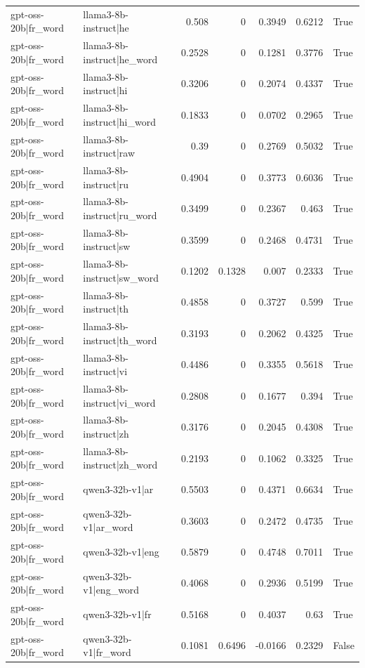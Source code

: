 \begin{table}
\begin{tabular}{l l r r r r l}
gpt-oss-20b|fr_word & llama3-8b-instruct|he & 0.508 & 0 & 0.3949 & 0.6212 & True \\
gpt-oss-20b|fr_word & llama3-8b-instruct|he_word & 0.2528 & 0 & 0.1281 & 0.3776 & True \\
gpt-oss-20b|fr_word & llama3-8b-instruct|hi & 0.3206 & 0 & 0.2074 & 0.4337 & True \\
gpt-oss-20b|fr_word & llama3-8b-instruct|hi_word & 0.1833 & 0 & 0.0702 & 0.2965 & True \\
gpt-oss-20b|fr_word & llama3-8b-instruct|raw & 0.39 & 0 & 0.2769 & 0.5032 & True \\
gpt-oss-20b|fr_word & llama3-8b-instruct|ru & 0.4904 & 0 & 0.3773 & 0.6036 & True \\
gpt-oss-20b|fr_word & llama3-8b-instruct|ru_word & 0.3499 & 0 & 0.2367 & 0.463 & True \\
gpt-oss-20b|fr_word & llama3-8b-instruct|sw & 0.3599 & 0 & 0.2468 & 0.4731 & True \\
gpt-oss-20b|fr_word & llama3-8b-instruct|sw_word & 0.1202 & 0.1328 & 0.007 & 0.2333 & True \\
gpt-oss-20b|fr_word & llama3-8b-instruct|th & 0.4858 & 0 & 0.3727 & 0.599 & True \\
gpt-oss-20b|fr_word & llama3-8b-instruct|th_word & 0.3193 & 0 & 0.2062 & 0.4325 & True \\
gpt-oss-20b|fr_word & llama3-8b-instruct|vi & 0.4486 & 0 & 0.3355 & 0.5618 & True \\
gpt-oss-20b|fr_word & llama3-8b-instruct|vi_word & 0.2808 & 0 & 0.1677 & 0.394 & True \\
gpt-oss-20b|fr_word & llama3-8b-instruct|zh & 0.3176 & 0 & 0.2045 & 0.4308 & True \\
gpt-oss-20b|fr_word & llama3-8b-instruct|zh_word & 0.2193 & 0 & 0.1062 & 0.3325 & True \\
gpt-oss-20b|fr_word & qwen3-32b-v1|ar & 0.5503 & 0 & 0.4371 & 0.6634 & True \\
gpt-oss-20b|fr_word & qwen3-32b-v1|ar_word & 0.3603 & 0 & 0.2472 & 0.4735 & True \\
gpt-oss-20b|fr_word & qwen3-32b-v1|eng & 0.5879 & 0 & 0.4748 & 0.7011 & True \\
gpt-oss-20b|fr_word & qwen3-32b-v1|eng_word & 0.4068 & 0 & 0.2936 & 0.5199 & True \\
gpt-oss-20b|fr_word & qwen3-32b-v1|fr & 0.5168 & 0 & 0.4037 & 0.63 & True \\
gpt-oss-20b|fr_word & qwen3-32b-v1|fr_word & 0.1081 & 0.6496 & -0.0166 & 0.2329 & False \\

\end{tabular}
\end{table}
